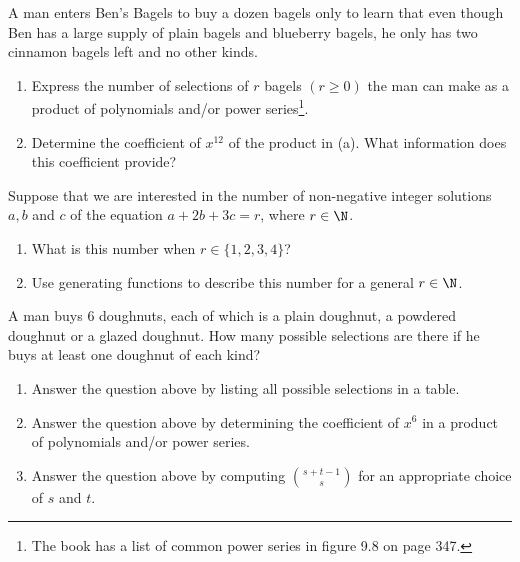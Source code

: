 \documentclass{homework}
\begin{document}
\question A man enters Ben's Bagels to buy a dozen bagels only to learn that even though Ben has a large supply of plain bagels and blueberry bagels, he only has two cinnamon bagels left and no other kinds.
\begin{enumerate}[label=(\alph*)]
    \item Express the number of selections of $r$ bagels $(r \geq 0)$ the man can make as a product of polynomials and/or power series\footnote{The book has a list of common power series in figure 9.8 on page 347.}.
    \item Determine the coefficient of $x^{12}$ of the product in (a). What information does this coefficient provide?
\end{enumerate}
\question Suppose that we are interested in the number of non-negative integer solutions $a, b$ and $c$ of the equation $a + 2b + 3c = r$, where $r \in \N$.
\begin{enumerate}[label=(\alph*)]
    \item What is this number when $r \in \{1, 2, 3, 4\}$?
    \item Use generating functions to describe this number for a general $r \in \N$.
\end{enumerate}
\question A man buys 6 doughnuts, each of which is a plain doughnut, a powdered doughnut or a glazed doughnut. How many possible selections are there if he buys at least one doughnut of each kind?
\begin{enumerate}[label=(\alph*)]
    \item Answer the question above by listing all possible selections in a table.
    \item Answer the question above by determining the coefficient of $x^6$ in a product of polynomials and/or power series.
    \item Answer the question above by computing $\binom{s+t-1}{s}$ for an appropriate choice of $s$ and $t$.
\end{enumerate}
\end{document}
